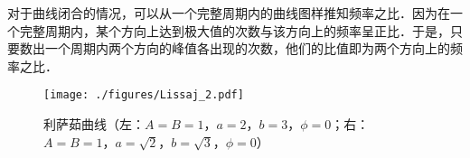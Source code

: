 对于曲线闭合的情况，可以从一个完整周期内的曲线图样推知频率之比．因为在一个完整周期内，某个方向上达到极大值的次数与该方向上的频率呈正比．于是，只要数出一个周期内两个方向的峰值各出现的次数，他们的比值即为两个方向上的频率之比．
\begin{figure}[ht]
\centering
\texttt{[image: ./figures/Lissaj\_2.pdf]}
\caption{利萨茹曲线（左：$A=B=1$，$a=2$，$b=3$，$\phi=0$；右：$A=B=1$，$a=\sqrt 2$，$b=\sqrt 3$，$\phi=0$）} \label{Lissaj_fig2}
\end{figure}
